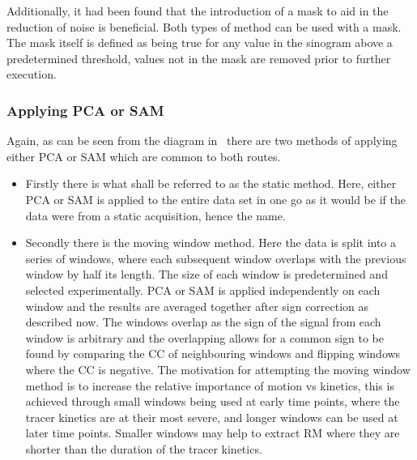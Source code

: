                     Additionally, it had been found that the introduction of a mask to aid in the reduction of noise is beneficial. Both types of method can be used with a mask. The mask itself is defined as being true for any value in the sinogram above a predetermined threshold, values not in the mask are removed prior to further execution.
                
                \subsubsection{Applying PCA or SAM} \label{sec:pca_data_driven_surrogate_signal_extraction_methods_for_dynamic_pet_methods_applying_pca_or_sam}
                    Again, as can be seen from the diagram in~ there are two methods of applying either \gls{PCA} or \gls{SAM} which are common to both routes.
                    
                    \begin{itemize}
                        \item Firstly there is what shall be referred to as the static method. Here, either \gls{PCA} or \gls{SAM} is applied to the entire data set in one go as it would be if the data were from a static acquisition, hence the name.
                        
                        \item Secondly there is the moving window method. Here the data is split into a series of windows, where each subsequent window overlaps with the previous window by half its length. The size of each window is predetermined and selected experimentally. \gls{PCA} or \gls{SAM} is applied independently on each window and the results are averaged together after sign correction as described now. The windows overlap as the sign of the signal from each window is arbitrary and the overlapping allows for a common sign to be found by comparing the \gls{CC} of neighbouring windows and flipping windows where the \gls{CC} is negative. The motivation for attempting the moving window method is to increase the relative importance of motion vs kinetics, this is achieved through small windows being used at early time points, where the tracer kinetics are at their most severe, and longer windows can be used at later time points. Smaller windows may help to extract \gls{RM} where they are shorter than the duration of the tracer kinetics.
                    \end{itemize}
                    
